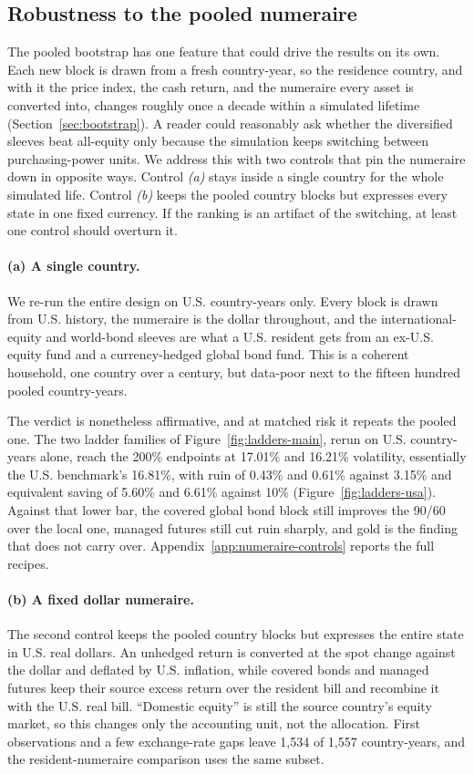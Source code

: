 \documentclass[11pt]{article}
\begin{document}
\subsection{Robustness to the pooled numeraire}
\label{sec:usd-numeraire}
\label{sec:usa-control}

The pooled bootstrap has one feature that could drive the results on its own.
Each new block is drawn from a fresh country-year, so the residence country,
and with it the price index, the cash return, and the numeraire every asset is
converted into, changes roughly once a decade within a simulated lifetime
(Section~\ref{sec:bootstrap}). A reader could reasonably ask whether the
diversified sleeves beat all-equity only because the simulation keeps switching
between purchasing-power units. We address this with two controls that pin the
numeraire down in opposite ways. Control \emph{(a)} stays inside a single
country for the whole simulated life. Control \emph{(b)} keeps the pooled
country blocks but expresses every state in one fixed currency. If the ranking
is an artifact of the switching, at least one control should overturn it.

\paragraph{(a) A single country.}
We re-run the entire design on U.S. country-years only. Every block is drawn
from U.S. history, the numeraire is the dollar throughout, and the
international-equity and world-bond sleeves are what a U.S. resident gets from an
ex-U.S. equity fund and a currency-hedged global bond fund. This is a coherent
household, one country over a century, but data-poor next to the fifteen
hundred pooled country-years.

The verdict is nonetheless affirmative, and at matched risk it repeats the
pooled one. The two ladder families of Figure~\ref{fig:ladders-main}, rerun on
U.S. country-years alone, reach the 200\% endpoints at 17.01\% and 16.21\%
volatility, essentially the U.S. benchmark's 16.81\%, with ruin of 0.43\% and
0.61\% against 3.15\% and equivalent saving of 5.60\% and 6.61\% against 10\%
(Figure~\ref{fig:ladders-usa}). Against that lower bar, the covered global
bond block still improves the 90/60 over the local one, managed futures still
cut ruin sharply, and gold is the finding that does not carry over.
Appendix~\ref{app:numeraire-controls} reports the full recipes.

\paragraph{(b) A fixed dollar numeraire.}
The second control keeps the pooled country blocks but expresses the entire
state in U.S. real dollars. An unhedged return is converted at the spot change
against the dollar and deflated by U.S. inflation, while covered bonds and
managed futures keep their source excess return over the resident bill and
recombine it with the U.S. real bill. ``Domestic equity'' is still the source
country's equity market, so this changes only the accounting unit, not the
allocation. First observations and a few exchange-rate gaps leave 1{,}534 of
1{,}557 country-years, and the resident-numeraire comparison uses the same
subset.
\end{document}
